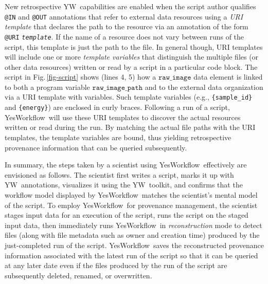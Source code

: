 \documentclass[letterpaper,twocolumn,10pt]{article}
\newcommand{\figref}[1]{Fig.\,\ref{#1}}
\newcommand{\code}[1]{\ensuremath{\mathtt{#1}}}
\newcommand{\YW}{\textsf{YesWorkflow}}
\newcommand{\yw}{\textsf{YW}}
\newcommand{\ywa}[1]{\texttt{#1}}
\begin{document}
New retrospective \yw\ capabilities are enabled when the script author
qualifies \ywa{@IN} and \ywa{@OUT} annotations that refer to external
data resources using a \emph{URI template} that declares the path to the resource via
an annotation of the form
\ywa{@URI}\,\textvisiblespace\,\ywa{\emph{template}}.  If the name of
a resource does not vary between runs of the script, this template is
just the path to the file.  In general though, URI templates will
include one or more \emph{template variables} that distinguish the
multiple files (or other data resources) written or read by a script
in a particular code block.  The script in \figref{fig-script} shows
(lines 4, 5) how a \code{raw\_image} data element is linked to both a
program variable \code{raw\_image\_path} and to the external data
organization via a URI template with variables. Such template variables (e.g.,
\verb|{sample_id}| and \verb|{energy}|) are enclosed in curly braces.
Following a run of a script, \YW\ will use these URI templates to
discover the actual resources written or read during the run.  By
matching the actual file paths with the URI templates, the template
variables are bound, thus yielding retrospective provenance
information that can be queried subsequently.

In summary, the steps taken by a scientist using \YW\ effectively are envisioned
as follows.
The scientist first writes a script, marks it up with \yw\ annotations, 
visualizes it using the \yw\ toolkit, and confirms that the workflow model 
displayed by \YW\ matches the scientist's mental model of the script.
To employ \YW\ for provenance management, the scientist stages input data 
for an execution of the script, runs the script on the staged input data, then
immediately runs \YW\ in \emph{reconstruction} mode to detect files 
(along with file metadata such as owner and creation time) 
produced by the just-completed run of the script. \YW\ saves
the reconstructed provenance information associated with the latest run of the script
so that it can be queried at any later date even if the files produced by the
run of the script are subsequently deleted, renamed, or overwritten.
\end{document}
